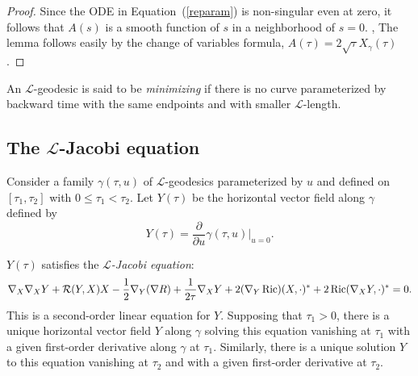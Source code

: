 \begin{proof}
\sketch
{}
Since the ODE in Equation~(\ref{reparam})  is non-singular even at
zero, it follows that $A(s)$ is a smooth function of $s$ in a
neighborhood of $s=0$. , The lemma follows easily by the change of
variables formula, $A(\tau)=2\sqrt{\tau}X_\gamma(\tau)$.
\end{proof}

\begin{definition}\label{def:l-geodesic-minimizing}

An ${\mathcal L}$-geodesic is said to be {\em
minimizing} if there is no
curve parameterized by backward time with the same endpoints and
with smaller ${\mathcal L}$-length.
\end{definition}


\subsection{The ${\mathcal L}$-Jacobi equation}

Consider a family $\gamma(\tau,u)$ of ${\mathcal L}$-geodesics parameterized by
$u$ and defined on $[\tau_1,\tau_2]$ with $0\le \tau_1<\tau_2$. Let $Y(\tau)$
be the horizontal vector field along $\gamma$ defined by
$$Y(\tau)=\frac{\partial}{\partial u}\gamma(\tau,u)|_{u=0}.$$


\begin{lemma}\label{lem:l-jacobi-equation}

$Y(\tau)$ satisfies the {\em ${\mathcal L}$-Jacobi
equation}:
\begin{equation}\label{jaceqn}\nabla_X\nabla_XY+{\mathcal
R}(Y,X)X-\frac{1}{2}\nabla_Y(\nabla
R)+\frac{1}{2\tau}\nabla_XY+2(\nabla_Y\operatorname{Ric})(X,\cdot)^*+2\operatorname{Ric}(\nabla_XY,\cdot)^*=0.\end{equation} This is a second-order
linear equation for $Y$. Supposing that $\tau_1>0$, there is a
unique horizontal vector field $Y$ along $\gamma$ solving this
equation vanishing at $\tau_1$ with a given first-order derivative
along $\gamma$ at $\tau_1$. Similarly, there is a unique solution
$Y$ to this equation vanishing at $\tau_2$ and with a given
first-order derivative at $\tau_2$.
\end{lemma}


